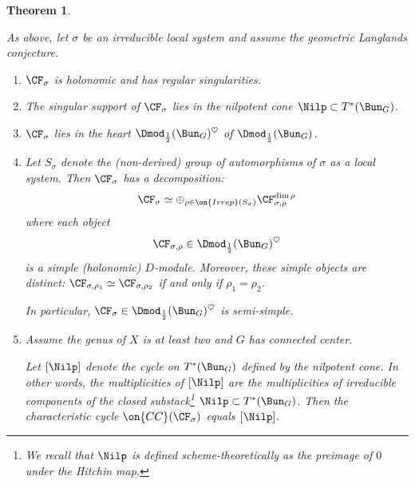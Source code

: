 \documentclass[9pt]{amsart}
\newtheorem{thm}[subsubsection]{Theorem}
\theoremstyle{remark}
\theoremstyle{definition}
\theoremstyle{remark}
\numberwithin{equation}{section}
\begin{document}
\begin{thm}\label{t:eigensheaves}

As above, let $\sigma$ be an irreducible local system and
assume the geometric Langlands conjecture.

\begin{enumerate}

\item\label{i:eigen-rs} $\CF_{\sigma}$ is holonomic and 
has regular singularities.

\item\label{i:eigen-nilp} 
The singular support of $\CF_{\sigma}$ lies in the
nilpotent cone $\Nilp \subset T^*(\Bun_G)$.

\item\label{i:eigen-perv} $\CF_{\sigma}$ lies in the heart 
$\Dmod_{\frac{1}{2}}(\Bun_G)^{\heartsuit}$ of 
$\Dmod_{\frac{1}{2}}(\Bun_G)$.

\item\label{i:eigen-l-packets} 

Let $S_{\sigma}$ denote the (non-derived) group of automorphisms of 
$\sigma$ as a local system. Then $\CF_{\sigma}$ has a decomposition: 
%
\[
\CF_{\sigma} \simeq 
\oplus_{\rho \in \on{Irrep}(S_{\sigma})}
\CF_{\sigma,\rho}^{\dim \rho}
\]
%
\noindent where each object
%
\[
\CF_{\sigma,\rho} \in \Dmod_{\frac{1}{2}}(\Bun_G)^{\heartsuit}
\]
%
\noindent is a \emph{simple} (holonomic) $D$-module.
Moreover, these simple objects are distinct: 
$\CF_{\sigma,\rho_1} \simeq \CF_{\sigma,\rho_2}$ if and only
if $\rho_1 = \rho_2$.

In particular,
$\CF_{\sigma} \in \Dmod_{\frac{1}{2}}(\Bun_G)^{\heartsuit}$ 
is semi-simple. 

\item\label{i:eigen-CC}

Assume the genus of $X$ is at least two and $G$ has connected center.

Let $[\Nilp]$ denote the cycle on $T^*(\Bun_G)$ defined
by the nilpotent cone. In other words, the multiplicities
of $[\Nilp]$ are the multiplicities of irreducible components
of the closed substack\footnote{We recall that $\Nilp$ is defined scheme-theoretically as the preimage of $0$ under the Hitchin map.}
$\Nilp \subset T^*(\Bun_G)$.
Then the characteristic cycle $\on{CC}(\CF_{\sigma})$ equals 
$[\Nilp]$.

\end{enumerate}

\end{thm}
\end{document}
